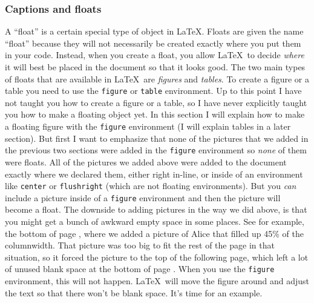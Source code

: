 \documentclass{article}
\begin{document}
\subsubsection{Captions and floats}\label{sec:captionsandfloats}
A ``float'' is a certain special type of object in \LaTeX.  Floats are given the name ``float'' because they will not necessarily be created exactly where you put them in your code.  Instead, when you create a float, you allow \LaTeX\ to decide \textit{where} it will best be placed in the document so that it looks good.  The two main types of floats that are available in \LaTeX\ are \textsl{figures} and \textsl{tables}.  To create a figure or a table you need to use the \texttt{figure} or \texttt{table} environment.  Up to this point I have not taught you how to create a figure or a table, so I have never explicitly taught you how to make a floating object yet.  In this section I will explain how to make a floating figure with the \texttt{figure} environment (I will explain tables in a later section).  But first I want to emphasize that none of the pictures that we added in the previous two sections were added in the \texttt{figure} environment so \textit{none} of them were floats.  All of the pictures we added above were added to the document exactly where we declared them, either right in-line, or inside of an environment like \texttt{center} or \texttt{flushright} (which are not floating environments).  But you \textit{can} include a picture inside of a \texttt{figure} environment and then the picture will become a float. The downside to adding pictures in the way we did above, is that you might get a bunch of awkward empty space in some places. See for example, the bottom of page \pageref{blankspace}, where we added a picture of Alice that filled up 45\% of the columnwidth.  That picture was too big to fit the rest of the page in that situation, so it forced the picture to the top of the following page, which left a lot of unused blank space at the bottom of page \pageref{blankspace}.  When you use the \texttt{figure} environment, this will not happen.  \LaTeX\ will move the figure around and adjust the text so that there won't be blank space. It's time for an example.
\end{document}

